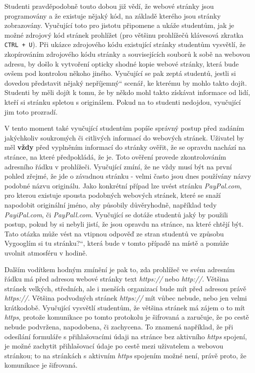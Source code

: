 \documentclass[a4paper, 12pt]{article}
\providecommand{\uv}[1]{\quotedblbase #1\textquotedblleft}
\begin{document}
Studenti pravděpodobně touto dobou již vědí, že webové stránky jsou programovány a že existuje nějaký kód, na základě kterého jsou stránky zobrazovány. Vyučující toto pro jistotu připomene a ukáže studentům, jak je možné zdrojový kód stránek prohlížet (pro většinu prohlížečů klávesová zkratka \texttt{CTRL + U}). Při ukázce zdrojového kódu existující stránky studentům vysvětlí, že zkopírováním zdrojového kódu stránky a souvisejících souborů k sobě na webovou adresu, by došlo k vytvoření opticky shodné kopie webové stránky, která bude ovšem pod kontrolou někoho jiného. Vyučující se pak zeptá studentů, jestli si dovedou představit nějaký \uv{nepříjemný} scenář, ke kterému by mohlo takto dojít. Studenti by měli dojít k tomu, že by někdo mohl takto získávat informace od lidí, kteří si stránku spletou s originálem. Pokud na to studenti nedojdou, vyučující jim toto prozradí.

V tento moment také vyučující studentům popíše správný postup před zadáním jakýchkoliv soukromých či citlivých informací do webových stránek. Uživatel by měl \textbf{vždy} před vyplněním informací do stránky ověřit, že se opravdu nachází na stránce, na které předpokládá, že je. Toto ověření provede zkontrolováním adresního řádku v prohlížeči. Vyučující zmíní, že ne vždy musí být na první pohled zřejmé, že jde o závadnou stránku - velmi často jsou dnes používány názvy podobné názvu originálu. Jako konkrétní případ lze uvést stránku \textit{PayPal.com}, pro kterou existuje spousta podobných webových stránek, které se snaží napodobit originální jméno, aby působily důvěryhodně, například tedy \textit{PayiPal.com}, či \textit{PayPall.com}. Vyučující se dotáže studentů jaký by použili postup, pokud by si nebyli jistí, že jsou opravdu na stránce, na které chtějí být. Tato otázka může vést na vtipnou odpověď ze stran studentů ve způsobu \uv{Vygooglím si tu stránku?}, která bude v tomto případě na místě a pomůže uvolnit atmosféru v hodině.

Dalším vodítkem hodným zmínění je pak to, zda prohlížeč ve svém adresním řádku má před adresou webové stránky text \textit{https://} nebo \textit{http://}. Většina stránek velkých, středních, ale i menších organizací bude mít před adresou právě \textit{https://}. Většina podvodných stránek \textit{https://} mít vůbec nebude, nebo jen velmi krátkodobě. Vyučující vysvětlí studentům, že většina stránek má zájem o to mít \textit{https}, protože komunikace po tomto protokolu je šifrovaná a zaručuje, že po cestě nebude podvržena, napodobena, či zachycena. To znamená například, že při odesílání formuláře s přihlašovacími údaji na stránce bez aktivního \textit{https} spojení, je možné zachytit přihlašovací údaje po cestě mezi uživatelem a webovou stránkou; to na stránkách s aktivním \textit{https} spojením možné není, právě proto, že komunikace je šifrovaná.
\end{document}
